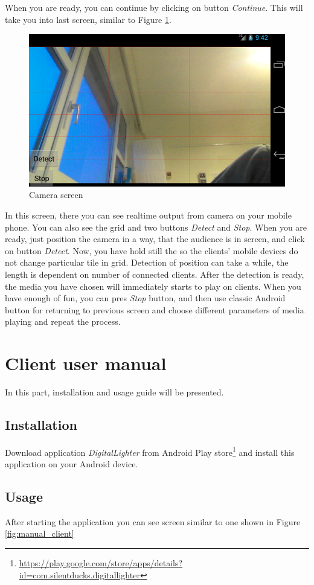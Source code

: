 When you are ready, you can continue by clicking on button \emph{Continue}.
This will take you into last screen, similar to Figure \ref{fig:manual_server3}.
\begin{figure}[h]
	\centering
		\includegraphics[width=12cm]{appendix/server9.png}
	\caption{Camera screen}
	\label{fig:manual_server3}
\end{figure}

In this screen, there you can see realtime output from camera on your mobile phone.
You can also see the grid and two buttons \emph{Detect} and \emph{Stop}.
When you are ready, just position the camera in a way, that the audience is in screen, and click on button \emph{Detect}.
Now, you have hold still the so the clients' mobile devices do not change particular tile in grid.
Detection of position can take a while, the length is dependent on number of connected clients.
After the detection is ready, the media you have chosen will immediately starts to play on clients.
When you have enough of fun, you can pres \emph{Stop} button, and then use classic Android button for returning to previous screen and choose different parameters of media playing and repeat the process.

\chapter{Client user manual}
In this part, installation and usage guide will be presented.
\section{Installation}
Download application \emph{DigitalLighter} from Android Play store\footnote{\url{https://play.google.com/store/apps/details?id=com.silentducks.digitallighter}} and install this application on your Android device.
\section{Usage}
After starting the application you can see screen similar to one shown in Figure \ref{fig:manual_client}

